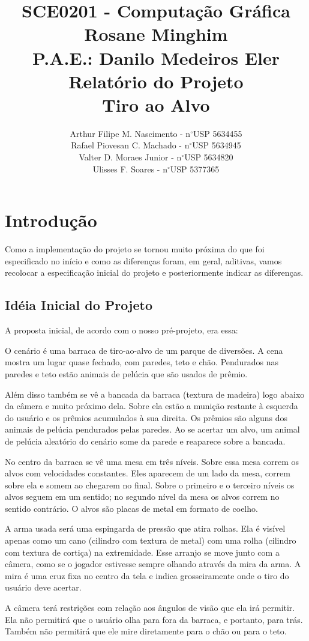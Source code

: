 \documentclass[a4paper,10pt]{article}
\title{
SCE0201 - Computação Gráfica\\
Rosane Minghim\\\vspace{0.5cm}
P.A.E.: Danilo Medeiros Eler\\\vspace{1cm}
Relatório do Projeto\\
Tiro ao Alvo
}
\author{
Arthur Filipe M. Nascimento - n\ensuremath{^\circ}USP 5634455\\
Rafael Piovesan C. Machado - n\ensuremath{^\circ}USP 5634945\\
Valter D. Moraes Junior - n\ensuremath{^\circ}USP 5634820\\
Ulisses F. Soares - n\ensuremath{^\circ}USP 5377365
}
\date{}
\begin{document}
\maketitle

\section{Introdução}
Como a implementação do projeto se tornou muito próxima do que foi especificado no início e como as diferenças foram, em geral, aditivas, vamos recolocar a especificação inicial do projeto e posteriormente indicar as diferenças.

\subsection{Idéia Inicial do Projeto}
A proposta inicial, de acordo com o nosso pré-projeto, era essa:

O cenário é uma barraca de tiro-ao-alvo de um parque de diversões. A cena mostra um lugar quase fechado, com paredes, teto e chão. Pendurados nas paredes e teto estão animais de pelúcia que são usados de prêmio.

Além disso também se vê a bancada da barraca (textura de madeira) logo abaixo da câmera e muito próximo dela. Sobre ela estão a munição restante à esquerda do usuário e os prêmios acumulados à sua direita. Os prêmios são alguns dos animais de pelúcia pendurados pelas paredes. Ao se acertar um alvo, um animal de pelúcia aleatório do cenário some da parede e reaparece sobre a bancada.

No centro da barraca se vê uma mesa em três níveis. Sobre essa mesa correm os alvos com velocidades constantes. Eles aparecem de um lado da mesa, correm sobre ela e somem ao chegarem no final. Sobre o primeiro e o terceiro níveis os alvos seguem em um sentido; no segundo nível da mesa os alvos correm no sentido contrário. O alvos são placas de metal em formato de coelho.

A arma usada será uma espingarda de pressão que atira rolhas. Ela é visível apenas como um cano (cilindro com textura de metal) com uma rolha (cilindro com textura de cortiça) na extremidade. Esse arranjo se move junto com a câmera, como se o jogador estivesse sempre olhando através da mira da arma. A mira é uma cruz fixa no centro da tela e indica grosseiramente onde o tiro do usuário deve acertar.

A câmera terá restrições com relação aos ângulos de visão que ela irá permitir. Ela não permitirá que o usuário olha para fora da barraca, e portanto, para trás. Também não permitirá que ele mire diretamente para o chão ou para o teto.
\end{document}
